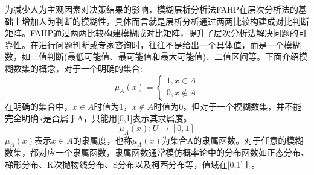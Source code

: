 为减少人为主观因素对决策结果的影响，模糊层析分析法FAHP在层次分析法的基础上增加人为判断的模糊性，具体而言就是层析分析通过两两比较构建成对比判断矩阵。FAHP通过两两比较构建模糊成对比矩阵，提升了层次分析法解决问题的可靠性。在进行问题判断或专家咨询时，往往不是给出一个具体值，而是一个模糊数，如三值判断(最低可能值、最可能值和最大可能值)、二值区间等。下面介绍模糊数集的概念，对于一个明确的集合:
\begin{equation}
\mu_{A}(x) = \left\{\begin{array}{l}
1, x\in A \\ [0.3cm]
0, x\notin A
\end{array}\right.
\end{equation}
在明确的集合中，$x\in A$时值为1，$x\notin A$时值为0。但对于一个模糊数集，并不能完全明确x是否属于A，只能用[0,1]表示其隶属度。
\begin{equation}
\mu_{A}(x):U\to[0,1]
\end{equation}
\begin{math}\mu_{A}(x)\end{math}表示\begin{math}x\in A\end{math}的隶属度，也称\begin{math}\mu_{A}(x)\end{math}为集合A的隶属函数。对于任意的模糊数集，都对应一个隶属函数，隶属函数通常模仿概率论中的分布函数如正态分布、梯形分布、K次抛物线分布、S分布以及柯西分布等，值域在[0,1]上。

